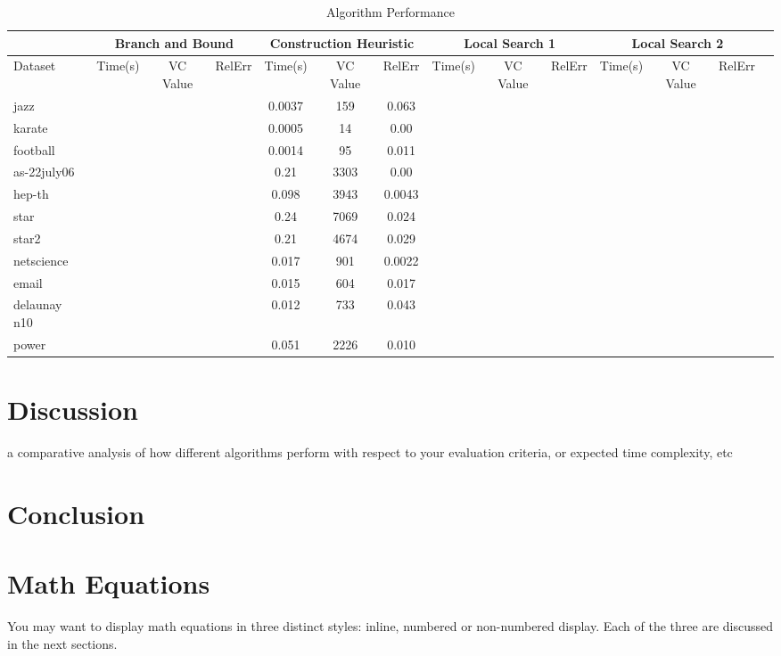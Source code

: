 \documentclass[acmlarge]{acmart}
\begin{document}
\begin{table}[H]
	\caption{Algorithm Performance}
	\label{tab:freq}
	\begin{tabular}{|l|c|c|c|c|c|c|c|c|c|c|c|c|c|}
		\toprule
		&\multicolumn{3}{c|}{Branch and Bound}&\multicolumn{3}{c|}{Construction Heuristic}&\multicolumn{3}{c|}{Local Search 1}&\multicolumn{3}{c|}{Local Search 2}\\
		\midrule
		Dataset&Time(s)&VC Value&RelErr&Time(s)&VC Value&RelErr&Time(s)&VC Value&RelErr&Time(s)&VC Value&RelErr&\\
		\midrule
		jazz&&&&0.0037&159&0.063&&&&&&\\
		karate&&&&0.0005&14&0.00&&&&&&\\
		football&&&&0.0014&95&0.011&&&&&&\\
		as-22july06&&&&0.21&3303&0.00&&&&&&\\
		hep-th&&&&0.098&3943&0.0043&&&&&&\\
		star&&&&0.24&7069&0.024&&&&&&\\
		star2&&&&0.21&4674&0.029&&&&&&\\
		netscience&&&&0.017&901&0.0022&&&&&&\\
		email&&&&0.015&604&0.017&&&&&&\\
		delaunay n10&&&&0.012&733&0.043&&&&&&\\
		power&&&&0.051&2226&0.010&&&&&&\\
		\bottomrule
	\end{tabular}
\label{table:alg_perf}
\end{table}


\section{Discussion}

a comparative analysis of how different algorithms perform with respect to your evaluation
criteria, or expected time complexity, etc


\section{Conclusion}



\section{Math Equations}
You may want to display math equations in three distinct styles:
inline, numbered or non-numbered display.  Each of the three are
discussed in the next sections.
\end{document}
